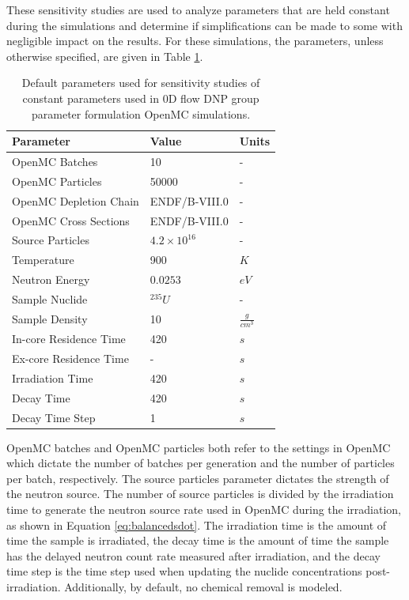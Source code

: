 These sensitivity studies are used to analyze parameters that are held constant during the simulations and determine if simplifications can be made to some with negligible impact on the results.
For these simulations, the parameters, unless otherwise specified, are given in Table \ref{tab:params-const}.

\begin{table}[H]
    \centering
    \begin{tabular}{lll}
        \hline
       Parameter  & Value & Units \\
       \hline
        OpenMC Batches & 10 & - \\
        OpenMC Particles & 50000 & - \\
        OpenMC Depletion Chain & ENDF/B-VIII.0 & - \\
        OpenMC Cross Sections & ENDF/B-VIII.0 & - \\
        Source Particles & $4.2\times 10^{16}$ & -\\
        Temperature & 900 & $K$\\
        Neutron Energy & $0.0253$ & $eV$\\
        Sample Nuclide & $^{235}U$ & -\\
        Sample Density & 10 & $\frac{g}{cm^3}$\\
        In-core Residence Time & 420 & $s$\\
        Ex-core Residence Time & - & $s$\\
        Irradiation Time & 420 & $s$\\
        Decay Time & 420 & $s$\\
        Decay Time Step & 1 & $s$\\
    \end{tabular}
    \caption{Default parameters used for sensitivity studies of constant parameters used in 0D flow \gls{DNP} group parameter formulation OpenMC simulations.}
    \label{tab:params-const}
\end{table}

OpenMC batches and OpenMC particles both refer to the settings in OpenMC which dictate the number of batches per generation and the number of particles per batch, respectively.
The source particles parameter dictates the strength of the neutron source.
The number of source particles is divided by the irradiation time to generate the neutron source rate used in OpenMC during the irradiation, as shown in Equation \eqref{eq:balancedsdot}.
The irradiation time is the amount of time the sample is irradiated, the decay time is the amount of time the sample has the delayed neutron count rate measured after irradiation, and the decay time step is the time step used when updating the nuclide concentrations post-irradiation.
Additionally, by default, no chemical removal is modeled.

